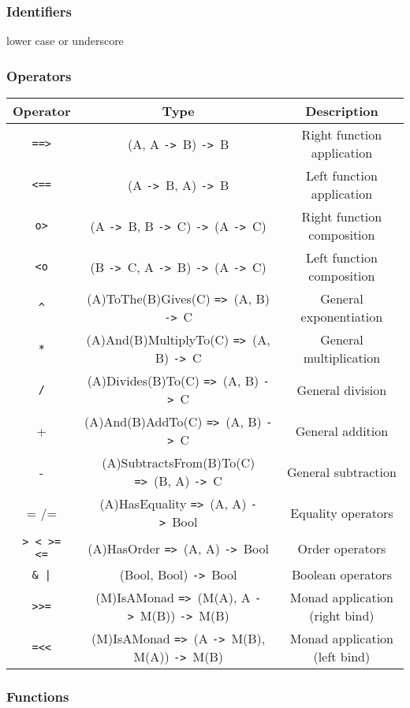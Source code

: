 \documentclass{article}
\def\ra{\texttt{->}\ }
\def\Ra{\texttt{=>}\ }
\begin{document}
\subsubsection{Identifiers}

lower case or underscore

\subsubsection{Operators}

\begin{tabular}{ |c|c|c| } 
\hline
Operator & Type & Description \\ 
\hline
\hline
\texttt{==>} & (A, A \ra B) \ra B & Right function application \\
\hline
\texttt{<==} & (A \ra B, A) \ra B & Left function application \\
\hline
\texttt{o>} & (A \ra B, B \ra C) \ra (A \ra C) & Right function composition \\
\hline
\texttt{<o} & (B \ra C, A \ra B) \ra (A \ra C) & Left function composition  \\
\hline
\texttt{\^} & (A)ToThe(B)Gives(C) \Ra (A, B) \ra C & General exponentiation \\
\hline
\texttt{*} & (A)And(B)MultiplyTo(C) \Ra (A, B) \ra C & General multiplication \\
\hline
\texttt{/} & (A)Divides(B)To(C) \Ra (A, B) \ra C & General division \\
\hline
+ & (A)And(B)AddTo(C) \Ra (A, B) \ra C & General addition \\ 
\hline
- & (A)SubtractsFrom(B)To(C) \Ra (B, A) \ra C & General subtraction \\
\hline
= /= & (A)HasEquality \Ra (A, A) \ra Bool & Equality operators \\
\hline
\texttt{> < >= <=} & (A)HasOrder \Ra (A, A) \ra Bool & Order operators \\
\hline
\texttt{\& |} & (Bool, Bool) \ra Bool & Boolean operators \\
\hline
\texttt{>>=} & (M)IsAMonad \Ra (M(A), A \ra M(B)) \ra M(B) & Monad application 
(right bind) \\
\hline
\texttt{=<<} & (M)IsAMonad \Ra (A \ra M(B), M(A)) \ra M(B) & Monad application 
(left bind) \\
\hline
\end{tabular}

\subsubsection{Functions}
\end{document}
